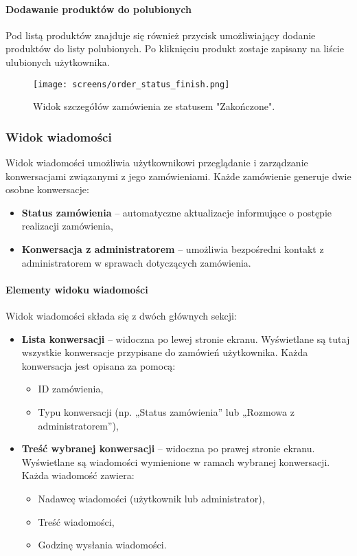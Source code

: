 \documentclass[12pt,a4paper,oneside]{article}
\theoremstyle{definition}
\numberwithin{equation}{section}
\begin{document}
\paragraph{Dodawanie produktów do polubionych}
Pod listą produktów znajduje się również przycisk umożliwiający dodanie produktów do listy polubionych. Po kliknięciu produkt zostaje zapisany na liście ulubionych użytkownika.

\begin{figure}[H]
    \centering
    \texttt{[image: screens/order\_status\_finish.png]}
    \caption{Widok szczegółów zamówienia ze statusem "Zakończone".}
    \label{fig:order_status_finish}
\end{figure}




\subsubsection{Widok wiadomości}
Widok wiadomości umożliwia użytkownikowi przeglądanie i zarządzanie konwersacjami związanymi z jego zamówieniami. Każde zamówienie generuje dwie osobne konwersacje:
\begin{itemize}
    \item \textbf{Status zamówienia} – automatyczne aktualizacje informujące o postępie realizacji zamówienia,
    \item \textbf{Konwersacja z administratorem} – umożliwia bezpośredni kontakt z administratorem w sprawach dotyczących zamówienia.
\end{itemize}

\paragraph{Elementy widoku wiadomości}
Widok wiadomości składa się z dwóch głównych sekcji:
\begin{itemize}
    \item \textbf{Lista konwersacji} – widoczna po lewej stronie ekranu. Wyświetlane są tutaj wszystkie konwersacje przypisane do zamówień użytkownika. Każda konwersacja jest opisana za pomocą:
    \begin{itemize}
        \item ID zamówienia,
        \item Typu konwersacji (np. „Status zamówienia” lub „Rozmowa z administratorem”),
    \end{itemize}
    \item \textbf{Treść wybranej konwersacji} – widoczna po prawej stronie ekranu. Wyświetlane są wiadomości wymienione w ramach wybranej konwersacji. Każda wiadomość zawiera:
    \begin{itemize}
        \item Nadawcę wiadomości (użytkownik lub administrator),
        \item Treść wiadomości,
        \item Godzinę wysłania wiadomości.
    \end{itemize}
\end{itemize}
\end{document}

